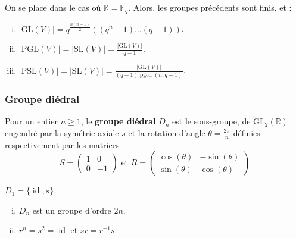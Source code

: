 	
	\begin{proposition}
		On se place dans le cas où $\mathbb{K} = \mathbb{F}_q$. Alors, les groupes précédents sont finis, et :
		\begin{enumerate}[(i)]
			\item $|\mathrm{GL}(V)| = q^{\frac{n(n-1)}{2}}((q^n-1) \dots (q-1))$.
			\item $|\mathrm{PGL}(V)| = |\mathrm{SL}(V)| = \frac{|\mathrm{GL}(V)|}{q-1}$.
			\item $|\mathrm{PSL}(V)| = |\mathrm{SL}(V)| = \frac{|\mathrm{GL}(V)|}{(q-1)\operatorname{pgcd}(n,q-1)}$.
		\end{enumerate}
	\end{proposition}
	
	\subsubsection{Groupe diédral}
	
	
	\begin{definition}
		Pour un entier $n \geq 1$, le \textbf{groupe diédral} $D_n$ est le sous-groupe, de $\mathrm{GL}_2(\mathbb{R})$ engendré par la symétrie axiale $s$ et la rotation d'angle $\theta = \frac{2\pi}{n}$ définies respectivement par les matrices
		\[
		S =
		\begin{pmatrix}
			1 & 0 \\
			0 & -1
		\end{pmatrix}
		\text{ et }
		R =
		\begin{pmatrix}
			\cos(\theta) & -\sin(\theta) \\
			\sin(\theta) & \cos(\theta)
		\end{pmatrix}
		\]
	\end{definition}
	
	\begin{example}
		$D_1 = \{ \operatorname{id}, s \}$.
	\end{example}
	
	\begin{proposition}
		\begin{enumerate}[(i)]
			\item $D_n$ est un groupe d'ordre $2n$.
			\item $r^n = s^2 = \operatorname{id}$ et $sr = r^{-1}s$.
		\end{enumerate}
	\end{proposition}
	

